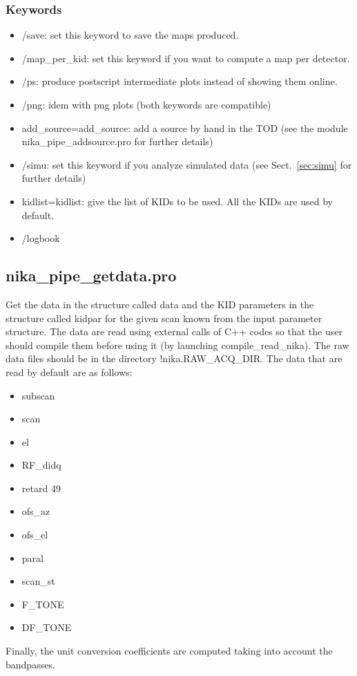 \documentclass[a4paper]{article}
\begin{document}
\subsubsection*{Keywords} 
\begin{itemize}
\item {\color{blue} /save}: set this keyword to save the maps produced.
\item {\color{blue} /map\_per\_kid}: set this keyword if you want to compute a map per detector.
\item {\color{blue} /ps}: produce postscript intermediate plots instead of showing them online.
\item {\color{blue} /png}: idem with png plots (both keywords are compatible)
\item {\color{blue} add\_source=add\_source}: add a source by hand in the TOD (see the module nika\_pipe\_addsource.pro for further details)
\item {\color{blue} /simu}: set this keyword if you analyze simulated data (see Sect.~\ref{sec:simu} for further details)
\item {\color{blue} kidlist=kidlist}: give the list of KIDs to be used. All the KIDs are used by default.
\item {\color{blue} /logbook}
\end{itemize}

\subsection{{\color{blue} nika\_pipe\_getdata.pro}}
Get the data in the structure called data and the KID parameters in the structure called kidpar for the given scan known from the input parameter structure. The data are read using external calls of C++ codes so that the user should compile them before using it (by launching {\color{blue} compile\_read\_nika}). The raw data files should be in the directory {\color{blue} !nika.RAW\_ACQ\_DIR}. The data that are read by default are as follows:
\begin{itemize}
\item {\color{blue} subscan}
\item {\color{blue} scan}
\item {\color{blue} el}
\item {\color{blue} RF\_didq}
\item {\color{blue} retard 49}
\item {\color{blue} ofs\_az}
\item {\color{blue} ofs\_el}
\item {\color{blue} paral}
\item {\color{blue} scan\_st} 
\item {\color{blue} F\_TONE}
\item {\color{blue} DF\_TONE}
\end{itemize}
Finally, the unit conversion coefficients are computed taking into account the bandpasses.
\end{document}
